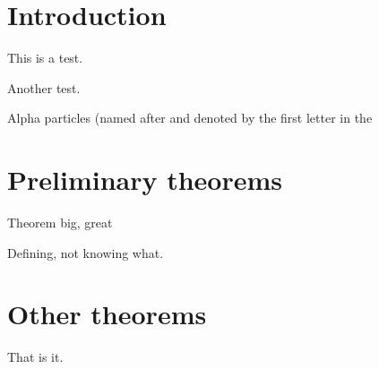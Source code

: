 \documentclass{article}
\begin{document}
  

\section{Introduction}
\begin{defn}
This is a test.
\end{defn}

\begin{thm}
Another test.
\end{thm}
Alpha particles (named after and denoted by the first letter in the

\section{Preliminary theorems}

\begin{thm}
Theorem big, great
\end{thm}

\begin{defn}
Defining, not knowing what.
\end{defn}

\section{Other theorems}
\begin{defn}
That is it.
\end{defn}
\end{document}

